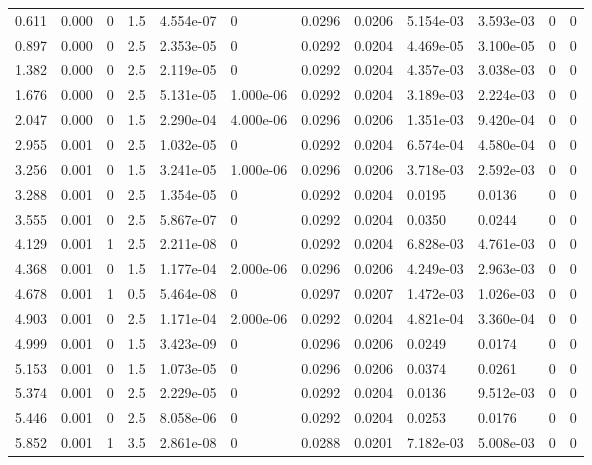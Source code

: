 \documentclass[preview]{standalone}
\begin{document}
{{\begin{tabular}{L{1.2cm}C{1.2cm} C{0.3cm}C{0.5cm} C{1.4cm}C{1.4cm} C{1.4cm}C{1.4cm} C{1.6cm}C{1.6cm} C{1.6cm}C{1.6cm}}
  0.611  &  0.000  & 0     & 1.5 &  4.554e-07  & 0  &  0.0296&   0.0206& 5.154e-03 & 3.593e-03   &  0 & 0  \\ 
  0.897  &  0.000  & 0     & 2.5 &  2.353e-05  & 0  &  0.0292&   0.0204& 4.469e-05 & 3.100e-05   &  0 & 0  \\ 
  1.382  &  0.000  & 0     & 2.5 &  2.119e-05  & 0  &  0.0292&   0.0204& 4.357e-03 & 3.038e-03   &  0 & 0  \\ 
  1.676  &  0.000  & 0     & 2.5 &  5.131e-05  & 1.000e-06  &  0.0292&   0.0204& 3.189e-03 & 2.224e-03   &  0 & 0  \\ 
  2.047  &  0.000  & 0     & 1.5 &  2.290e-04  & 4.000e-06  &  0.0296&   0.0206& 1.351e-03 & 9.420e-04   &  0 & 0  \\ 
  2.955  &  0.001  & 0     & 2.5 &  1.032e-05  & 0  &  0.0292&   0.0204& 6.574e-04 & 4.580e-04   &  0 & 0  \\ 
  3.256  &  0.001  & 0     & 1.5 &  3.241e-05  & 1.000e-06  &  0.0296&   0.0206& 3.718e-03 & 2.592e-03   &  0 & 0  \\ 
  3.288  &  0.001  & 0     & 2.5 &  1.354e-05  & 0  &  0.0292&   0.0204& 0.0195 & 0.0136   &  0 & 0  \\ 
  3.555  &  0.001  & 0     & 2.5 &  5.867e-07  & 0  &  0.0292&   0.0204& 0.0350 & 0.0244   &  0 & 0  \\ 
  4.129  &  0.001  & 1     & 2.5 &  2.211e-08  & 0  &  0.0292&   0.0204& 6.828e-03 & 4.761e-03   &  0 & 0  \\ 
  4.368  &  0.001  & 0     & 1.5 &  1.177e-04  & 2.000e-06  &  0.0296&   0.0206& 4.249e-03 & 2.963e-03   &  0 & 0  \\ 
  4.678  &  0.001  & 1     & 0.5 &  5.464e-08  & 0  &  0.0297&   0.0207& 1.472e-03 & 1.026e-03   &  0 & 0  \\ 
  4.903  &  0.001  & 0     & 2.5 &  1.171e-04  & 2.000e-06  &  0.0292&   0.0204& 4.821e-04 & 3.360e-04   &  0 & 0  \\ 
  4.999  &  0.001  & 0     & 1.5 &  3.423e-09  & 0  &  0.0296&   0.0206& 0.0249 & 0.0174   &  0 & 0  \\ 
  5.153  &  0.001  & 0     & 1.5 &  1.073e-05  & 0  &  0.0296&   0.0206& 0.0374 & 0.0261   &  0 & 0  \\ 
  5.374  &  0.001  & 0     & 2.5 &  2.229e-05  & 0  &  0.0292&   0.0204& 0.0136 & 9.512e-03   &  0 & 0  \\ 
  5.446  &  0.001  & 0     & 2.5 &  8.058e-06  & 0  &  0.0292&   0.0204& 0.0253 & 0.0176   &  0 & 0  \\ 
  5.852  &  0.001  & 1     & 3.5 &  2.861e-08  & 0  &  0.0288&   0.0201& 7.182e-03 & 5.008e-03   &  0 & 0  \\ 

\end{tabular}}}
\end{document}

